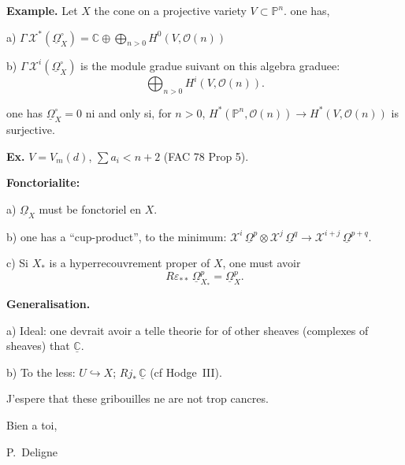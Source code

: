 \documentclass[11pt,a4paper]{article}
\theoremstyle{plain}
\theoremstyle{definition}
\begin{document}
\vspace{0.3cm}

\noindent\textbf{Example.} Let $X$ the cone on a projective variety $V \subset \mathbb{P}^{n}$. one has,

a) $\Gamma\, \mathcal{X}^{*}(\underline{\Omega}^{\circ}_{X}) = \mathbb{C} \oplus \displaystyle\bigoplus_{n > 0} H^{0}(V, \mathcal{O}(n))$

b) $\Gamma\, \mathcal{X}^{i}(\underline{\Omega}^{\circ}_{X})$ is the module gradue suivant on this algebra graduee:
\[
\bigoplus_{n > 0} H^{i}(V, \mathcal{O}(n)).
\]

one has $\underline{\Omega}^{\circ}_{X} = 0$ ni and only si, for $n > 0$, $H^{*}(\mathbb{P}^{n}, \mathcal{O}(n)) \to H^{*}(V, \mathcal{O}(n))$ is surjective.

\noindent\textbf{Ex.} $V = V_{m}(d)$, $\sum a_{i} < n+2$ (FAC 78 Prop 5).

\vspace{0.5cm}

\noindent\textbf{Fonctorialite:}

a) $\underline{\Omega}_{X}$ must be fonctoriel en $X$.

b) one has a ``cup-product'', to the minimum: $\mathcal{X}^{i}\,\underline{\Omega}^{p} \otimes \mathcal{X}^{j}\,\underline{\Omega}^{q} \to \mathcal{X}^{i+j}\,\underline{\Omega}^{p+q}$.

c) Si $X_{*}$ is a hyperrecouvrement proper of $X$, one must avoir
\[
R\varepsilon_{**}\,\underline{\Omega}^{p}_{X_{*}} = \underline{\Omega}^{p}_{X}.
\]

\vspace{0.5cm}

\noindent\textbf{Generalisation.}

a) Ideal: one devrait avoir a telle theorie for of other sheaves (complexes of sheaves) that $\underline{\mathbb{C}}$.

b) To the less: $U \hookrightarrow X$; $Rj_{*}\,\underline{\mathbb{C}}$ \quad (cf Hodge~III).

\vspace{1cm}

\begin{center}
J'espere that these gribouilles ne are not trop cancres.
\end{center}

\vspace{0.5cm}

Bien a toi,

\vspace{0.5cm}

\hspace{3cm} P.~Deligne
\end{document}
